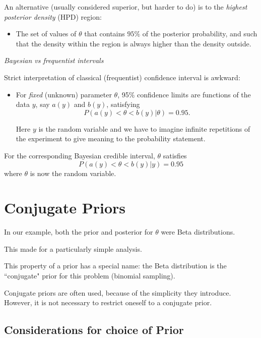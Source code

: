 An alternative (usually considered superior, but harder to do)
is to the {\em highest posterior density} (HPD) region:
\begin{itemize}
\item[] The set of values of $\theta $
 that contains $95\%$ of the posterior probability, and such that the density within the region is always higher than the density outside.
\end{itemize}
    \es\bs
    
{\color{section0}\em Bayesian vs frequentist intervals}

 Strict interpretation of classical (frequentist) confidence interval is awkward:
\begin{itemize}
\item[] For {\em fixed} (unknown) parameter $\theta$, 95\% confidence limits are
functions of the data $y$, say $a(y)$ and $b(y)$, satisfying
$$P\left( {\left. {a\left( y \right) < \theta  < b\left( y \right)} \right|\theta } \right) = 0.95.$$

Here $y$ is the random variable and we have to imagine infinite repetitions
of the experiment to give meaning to the probability statement.
\end{itemize}
For the corresponding Bayesian credible interval, $\theta$ satisfies
$$P\left( {\left. {a\left( y
\right) < \theta  < b\left( y \right)} \right|y} \right) = 0.95$$ where
$\theta $ is now the random variable.

\es\bs

\section*{\hfil Conjugate Priors}

In our example, both the prior and posterior for $\theta$ were Beta
distributions.

This made for a particularly simple analysis.

This property of a prior has a special name: the Beta distribution
is the ``conjugate" prior for this problem (binomial sampling).

Conjugate priors are often used, because of the simplicity they
introduce. However, it is not necessary to restrict oneself to
a conjugate prior.

\es\bs

\subsection*{Considerations for choice of Prior}

